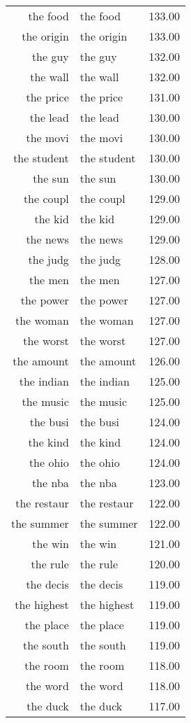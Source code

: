 \begin{table}[ht]
\begin{tabular}{rlr}
  the food & the food & 133.00 \\ 
  the origin & the origin & 133.00 \\ 
  the guy & the guy & 132.00 \\ 
  the wall & the wall & 132.00 \\ 
  the price & the price & 131.00 \\ 
  the lead & the lead & 130.00 \\ 
  the movi & the movi & 130.00 \\ 
  the student & the student & 130.00 \\ 
  the sun & the sun & 130.00 \\ 
  the coupl & the coupl & 129.00 \\ 
  the kid & the kid & 129.00 \\ 
  the news & the news & 129.00 \\ 
  the judg & the judg & 128.00 \\ 
  the men & the men & 127.00 \\ 
  the power & the power & 127.00 \\ 
  the woman & the woman & 127.00 \\ 
  the worst & the worst & 127.00 \\ 
  the amount & the amount & 126.00 \\ 
  the indian & the indian & 125.00 \\ 
  the music & the music & 125.00 \\ 
  the busi & the busi & 124.00 \\ 
  the kind & the kind & 124.00 \\ 
  the ohio & the ohio & 124.00 \\ 
  the nba & the nba & 123.00 \\ 
  the restaur & the restaur & 122.00 \\ 
  the summer & the summer & 122.00 \\ 
  the win & the win & 121.00 \\ 
  the rule & the rule & 120.00 \\ 
  the decis & the decis & 119.00 \\ 
  the highest & the highest & 119.00 \\ 
  the place & the place & 119.00 \\ 
  the south & the south & 119.00 \\ 
  the room & the room & 118.00 \\ 
  the word & the word & 118.00 \\ 
  the duck & the duck & 117.00 \\ 

\end{tabular}
\end{table}
